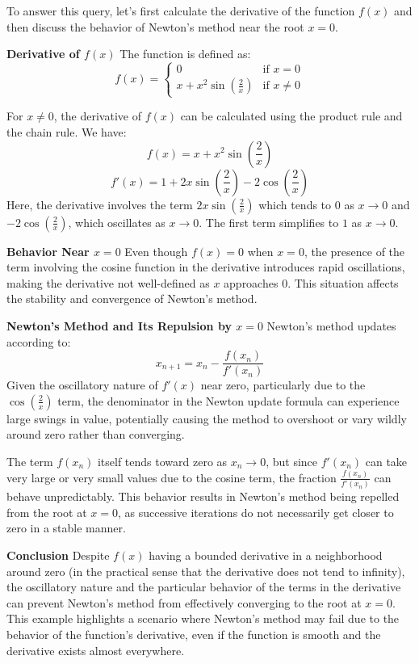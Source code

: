 \documentclass[8pt]{article}
\begin{document}
To answer this query, let's first calculate the derivative of the function \(f(x)\) and then discuss the behavior of Newton's method near the root \(x = 0\).

\textbf{Derivative of \(f(x)\)}
The function is defined as:
\[
f(x) = \begin{cases} 
0 & \text{if } x = 0 \\
x + x^2 \sin\left(\frac{2}{x}\right) & \text{if } x \neq 0
\end{cases}
\]

For \(x \neq 0\), the derivative of \(f(x)\) can be calculated using the product rule and the chain rule. We have:
\[
f(x) = x + x^2 \sin\left(\frac{2}{x}\right)
\]
\[
f'(x) = 1 + 2x \sin\left(\frac{2}{x}\right) - 2 \cos\left(\frac{2}{x}\right)
\]
Here, the derivative involves the term \(2x \sin\left(\frac{2}{x}\right)\) which tends to \(0\) as \(x \to 0\) and \(-2 \cos\left(\frac{2}{x}\right)\), which oscillates as \(x \to 0\). The first term simplifies to \(1\) as \(x \to 0\).

\textbf{Behavior Near \(x = 0\)}
Even though \(f(x) = 0\) when \(x = 0\), the presence of the term involving the cosine function in the derivative introduces rapid oscillations, making the derivative not well-defined as \(x\) approaches \(0\). This situation affects the stability and convergence of Newton's method.

\textbf{Newton’s Method and Its Repulsion by \(x = 0\)}
Newton's method updates according to:
\[
x_{n+1} = x_n - \frac{f(x_n)}{f'(x_n)}
\]
Given the oscillatory nature of \(f'(x)\) near zero, particularly due to the \(\cos\left(\frac{2}{x}\right)\) term, the denominator in the Newton update formula can experience large swings in value, potentially causing the method to overshoot or vary wildly around zero rather than converging.

The term \(f(x_n)\) itself tends toward zero as \(x_n \to 0\), but since \(f'(x_n)\) can take very large or very small values due to the cosine term, the fraction \(\frac{f(x_n)}{f'(x_n)}\) can behave unpredictably. This behavior results in Newton's method being repelled from the root at \(x = 0\), as successive iterations do not necessarily get closer to zero in a stable manner.

\textbf{Conclusion}
Despite \(f(x)\) having a bounded derivative in a neighborhood around zero (in the practical sense that the derivative does not tend to infinity), the oscillatory nature and the particular behavior of the terms in the derivative can prevent Newton's method from effectively converging to the root at \(x = 0\). This example highlights a scenario where Newton’s method may fail due to the behavior of the function's derivative, even if the function is smooth and the derivative exists almost everywhere.
\end{document}
